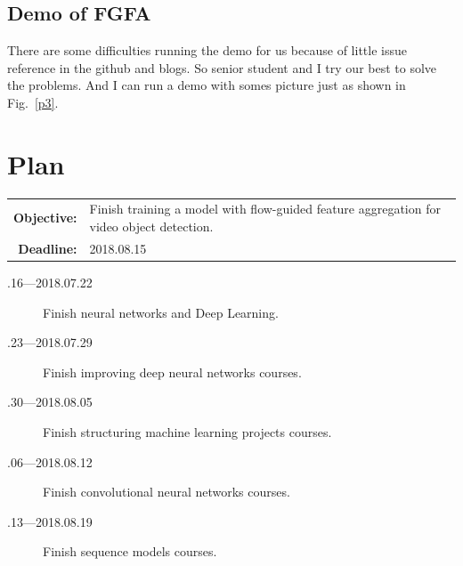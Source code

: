 \documentclass[a4paper]{article}
\begin{document}
\subsection{Demo of FGFA}

There are some difficulties running the demo for us because of little issue reference in the github and blogs. So senior student and I try our best to solve the problems. And I can run a demo with somes picture just as shown in Fig.~\ref{p3}.

\section{Plan}

\begin{tabular}{rl}
	\textbf{Objective:} & Finish training a model with flow-guided feature aggregation for video object detection. \\
	\textbf{Deadline:} & 2018.08.15
\end{tabular}

\begin{description}
	\item[.16---2018.07.22] Finish neural networks and Deep Learning.
	\item[.23---2018.07.29] Finish improving deep neural networks courses.
	\item[.30---2018.08.05] Finish structuring machine learning projects courses.
	\item[.06---2018.08.12] Finish convolutional neural networks courses.
	\item[.13---2018.08.19] Finish sequence models courses.
\end{description}





\end{document}
